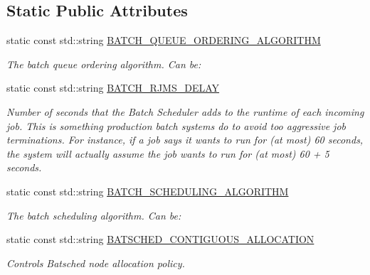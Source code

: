 \subsection*{Static Public Attributes}
\begin{DoxyCompactItemize}
\item 
static const std\+::string \hyperlink{classwrench_1_1_batch_service_property_a51cc79b2c963a67dac5685fbba4e5a9f}{B\+A\+T\+C\+H\+\_\+\+Q\+U\+E\+U\+E\+\_\+\+O\+R\+D\+E\+R\+I\+N\+G\+\_\+\+A\+L\+G\+O\+R\+I\+T\+HM}
\begin{DoxyCompactList}\small\item\em The batch queue ordering algorithm. Can be\+: \end{DoxyCompactList}\item 
\mbox{\label{classwrench_1_1_batch_service_property_a685c9784445ed28adbe43f69ccb98249}} 
static const std\+::string \hyperlink{classwrench_1_1_batch_service_property_a685c9784445ed28adbe43f69ccb98249}{B\+A\+T\+C\+H\+\_\+\+R\+J\+M\+S\+\_\+\+D\+E\+L\+AY}
\begin{DoxyCompactList}\small\item\em Number of seconds that the Batch Scheduler adds to the runtime of each incoming job. This is something production batch systems do to avoid too aggressive job terminations. For instance, if a job says it wants to run for (at most) 60 seconds, the system will actually assume the job wants to run for (at most) 60 + 5 seconds. \end{DoxyCompactList}\item 
static const std\+::string \hyperlink{classwrench_1_1_batch_service_property_aceb0af1c33f5ff2da347f54a484ce32e}{B\+A\+T\+C\+H\+\_\+\+S\+C\+H\+E\+D\+U\+L\+I\+N\+G\+\_\+\+A\+L\+G\+O\+R\+I\+T\+HM}
\begin{DoxyCompactList}\small\item\em The batch scheduling algorithm. Can be\+: \end{DoxyCompactList}\item 
static const std\+::string \hyperlink{classwrench_1_1_batch_service_property_ac21c68a5a297ba00fc919cec0d90c18d}{B\+A\+T\+S\+C\+H\+E\+D\+\_\+\+C\+O\+N\+T\+I\+G\+U\+O\+U\+S\+\_\+\+A\+L\+L\+O\+C\+A\+T\+I\+ON}
\begin{DoxyCompactList}\small\item\em Controls Batsched node allocation policy. \end{DoxyCompactList}\item 

\end{DoxyCompactItemize}
